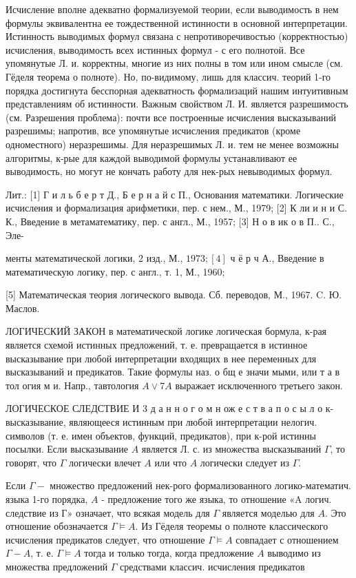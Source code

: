 \documentclass[10pt]{article}
\begin{document}
Исчисление вполне адекватно формализуемой теории, если выводимость в нем формулы эквивалентна ее тождественной истинности в основной интерпретации. Истинность выводимых формул связана с непротиворечивостью (корректностью) исчисления, выводимость всех истинных формул - с его полнотой. Все упомянутые Л. и. корректны, многие из них полны в том или ином смысле (см. Гёделя теорема о полноте). Но, по-видимому, лишь для классич. теорий 1-го порядка достигнута бесспорная адекватность формализаций нашим интуитивным представлениям об истинности. Важным свойством Л. И. является разрешимость (см. Разрешения проблема): почти все построенные исчисления высказываний разрешимы; напротив, все упомянутые исчисления предикатов (кроме одноместного) неразрешимы. Для неразрешимых Л. и. тем не менее возможны алгоритмы, к-рые для каждой выводимой формулы устанавливают ее выводимость, но могут не кончать работу для нек-рых невыводимых формул.



Лит.: [1] Г и л ь б е р т Д., Б е р н а й с П., Основания математики. Логические исчисления и формализация арифметики, пер. с нем., М., 1979; [2] К ли и н и С. К., Введение в метаматематику, пер. с англ., М., 1957; [3] Н о в ик о в П.. С., Эле-

менты математической логики, 2 изд., М., $1973 ;[4]$ ч ё р ч А., Введение в математическую логику, пер. с англ., т. 1, М., 1960;

[5] Математическая теория логического вывода. Сб. переводов, М., 1967. C. Ю. Маслов.



ЛОГИЧЕСКИЙ ЗАКОН в математической логике логическая бормула, к-рая является схемой истинных предложений, т. е. превращается в истинное высказывание при любой интерпретации входящих в нее переменных для высказываний и предикатов. Такие формулы наз. о бщ е значи мыми, или т а в тол огия м и. Напр., тавтология $A \vee 7 A$ выражает исключенного третьего закон.



ЛОГИЧЕСКОЕ СЛЕДСТВИЕ И 3 д а н н о г о м н ож е с т в а п о с ы л о к- высказывание, являющееся истинным при любой интерпретации нелогич. символов (т. е. имен объектов, функций, предикатов), при к-рой истинны посылки. Если высказывание $A$ является Л. с. из множества высказываний $\Gamma$, то говорят, что $\Gamma$ логически влечет $A$ или что $A$ логически следует из $\Gamma$.



Если $\Gamma-$ множество предложений нек-рого формализованного логико-математич. языка 1-го порядка, $A$ - предложение того же языка, то отношение «A логич. следствие из Г» означает, что всякая модель для $\Gamma$ является моделью для $A$. Это отношение обозначается $\Gamma \models A$. Из Гёделя теоремы о полноте классического исчисления предикатов следует, что отношение $\Gamma \models A$ совпадает с отношением $\Gamma-A$, т. е. $\Gamma \models A$ тогда и только тогда, когда предложение $A$ выводимо из множества предложений $\Gamma$ средствами классич. исчисления предикатов
\end{document}

